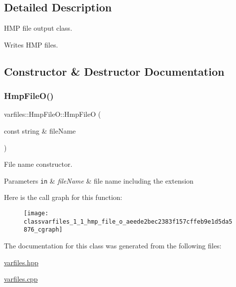 \subsection{Detailed Description}
H\+MP file output class. 

Writes H\+MP files. 

\subsection{Constructor \& Destructor Documentation}
\mbox{\label{classvarfiles_1_1_hmp_file_o_aeede2bec2383f157cffeb9e1d5da5876}} 
\subsubsection{\texorpdfstring{Hmp\+File\+O()}{HmpFileO()}}
{\footnotesize\ttfamily varfiles\+::\+Hmp\+File\+O\+::\+Hmp\+FileO (\begin{DoxyParamCaption}\item[{const string \&}]{file\+Name }\end{DoxyParamCaption})\hspace{0.3cm}{\ttfamily [inline]}}



File name constructor. 


\begin{DoxyParams}[1]{Parameters}
\mbox{\tt in}  & {\em file\+Name} & file name including the extension \\
\hline
\end{DoxyParams}
Here is the call graph for this function\+:\nopagebreak
\begin{figure}[H]
\begin{center}
\leavevmode
\texttt{[image: classvarfiles\_1\_1\_hmp\_file\_o\_aeede2bec2383f157cffeb9e1d5da5876\_cgraph]}
\end{center}
\end{figure}


The documentation for this class was generated from the following files\+:\begin{DoxyCompactItemize}
\item 
\hyperlink{varfiles_8hpp}{varfiles.\+hpp}\item 
\hyperlink{varfiles_8cpp}{varfiles.\+cpp}\end{DoxyCompactItemize}
